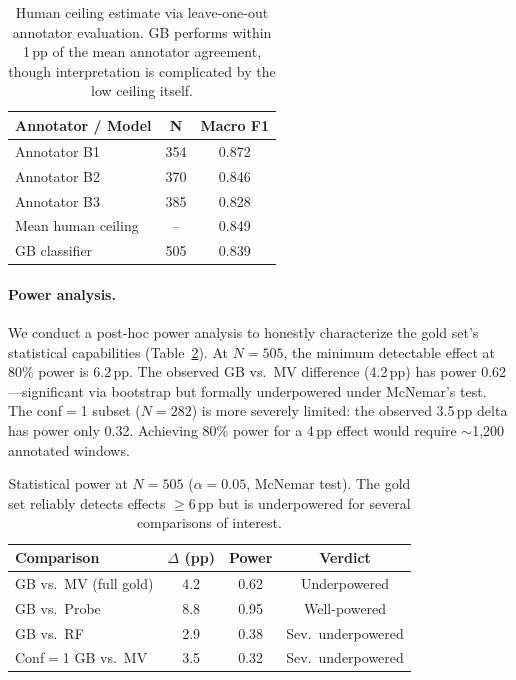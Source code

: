 \documentclass[11pt,a4paper]{article}
\begin{document}
\begin{table}[t]
\centering
\small
\begin{tabular}{lcc}
\toprule
\textbf{Annotator / Model} & \textbf{N} & \textbf{Macro F1} \\
\midrule
Annotator B1 & 354 & 0.872 \\
Annotator B2 & 370 & 0.846 \\
Annotator B3 & 385 & 0.828 \\
\midrule
Mean human ceiling & -- & 0.849 \\
\midrule
GB classifier & 505 & 0.839 \\
\bottomrule
\end{tabular}
\caption{Human ceiling estimate via leave-one-out annotator evaluation. GB performs within 1\,pp of the mean annotator agreement, though interpretation is complicated by the low ceiling itself.}
\label{tab:ceiling}
\end{table}

\paragraph{Power analysis.}
We conduct a post-hoc power analysis to honestly characterize the gold set's statistical capabilities (Table~\ref{tab:power}).
At $N{=}505$, the minimum detectable effect at 80\% power is 6.2\,pp.
The observed GB vs.\ MV difference (4.2\,pp) has power 0.62---significant via bootstrap but formally underpowered under McNemar's test.
The conf${=}$1 subset ($N{=}282$) is more severely limited: the observed 3.5\,pp delta has power only 0.32.
Achieving 80\% power for a 4\,pp effect would require ${\sim}$1,200 annotated windows.

\begin{table}[t]
\centering
\small
\begin{tabular}{lccc}
\toprule
\textbf{Comparison} & \textbf{$\Delta$ (pp)} & \textbf{Power} & \textbf{Verdict} \\
\midrule
GB vs.\ MV (full gold) & 4.2 & 0.62 & Underpowered \\
GB vs.\ Probe & 8.8 & 0.95 & Well-powered \\
GB vs.\ RF & 2.9 & 0.38 & Sev.\ underpowered \\
Conf${=}$1 GB vs.\ MV & 3.5 & 0.32 & Sev.\ underpowered \\
\bottomrule
\end{tabular}
\caption{Statistical power at $N{=}505$ ($\alpha{=}0.05$, McNemar test). The gold set reliably detects effects $\geq$6\,pp but is underpowered for several comparisons of interest.}
\label{tab:power}
\end{table}
\end{document}
